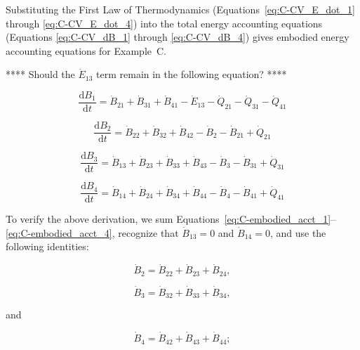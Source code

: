 Substituting the First Law of Thermodynamics 
(Equations~\ref{eq:C-CV_E_dot_1} through \ref{eq:C-CV_E_dot_4}) 
into the total energy accounting equations 
(Equations \ref{eq:C-CV_dB_1} through \ref{eq:C-CV_dB_4}) 
gives embodied energy accounting equations for Example~C.

**** Should the $\dot{E}_{13}$ term remain in the following equation? ****

\begin{equation} \label{eq:C-embodied_acct_1}
	\frac{\mathrm{d}B_{1}}{\mathrm{d}t} 	 
	= \dot{B}_{21} 
	+ \dot{B}_{31} 
	+ \dot{B}_{41} 
	- \dot{E}_{13} 
	- \dot{Q}_{21} 
	- \dot{Q}_{31} 
	- \dot{Q}_{41}
\end{equation}

\begin{equation} \label{eq:C-embodied_acct_2}
	\frac{\mathrm{d}B_{2}}{\mathrm{d}t} 	 
	= \dot{B}_{22}
	+ \dot{B}_{32} 
	+ \dot{B}_{42} 
	- \dot{B}_{2}
	- \dot{B}_{21}
	+ \dot{Q}_{21} 
\end{equation}

\begin{equation} \label{eq:C-embodied_acct_3}
	\frac{\mathrm{d}B_{3}}{\mathrm{d}t} 	 
	= \dot{B}_{13} 
	+ \dot{B}_{23}
	+ \dot{B}_{33} 
	+ \dot{B}_{43} 
	- \dot{B}_{3} 
	- \dot{B}_{31}
	+ \dot{Q}_{31} 
\end{equation}

\begin{equation} \label{eq:C-embodied_acct_4}
	\frac{\mathrm{d}B_{4}}{\mathrm{d}t}	 
	= \dot{B}_{14} 
	+ \dot{B}_{24}
	+ \dot{B}_{34} 
	+ \dot{B}_{44} 
	- \dot{B}_{4} 
	- \dot{B}_{41}
	+ \dot{Q}_{41} 
\end{equation}

To verify the above derivation, 
we sum 
Equations~\ref{eq:C-embodied_acct_1}--\ref{eq:C-embodied_acct_4},
recognize that $\dot{B}_{13} = 0$ and $\dot{B}_{14} = 0$, 
and use the following identities:

\begin{equation} \label{eq:C-B_sum_2_output}
	\dot{B}_2 
	= \dot{B}_{22} 
	+ \dot{B}_{23} 
	+ \dot{B}_{24},
\end{equation}

\begin{equation} \label{eq:C-B_sum_3_output}
	\dot{B}_3 
	= \dot{B}_{32} 
	+ \dot{B}_{33} 
	+ \dot{B}_{34},
\end{equation}

\noindent and

\begin{equation} \label{eq:C-B_sum_4_output}
	\dot{B}_4 
	= \dot{B}_{42} 
	+ \dot{B}_{43} 
	+ \dot{B}_{44};
\end{equation}

